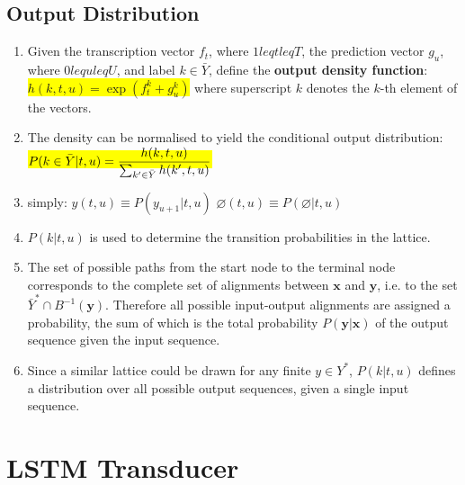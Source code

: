 \subsection{Output Distribution}

\begin{enumerate}
    \item Given the transcription vector $f_t$, where $1 leq t leq T $, the prediction vector $g_u$, where $0 leq u leq U $, and label $k \in \bar{Y}$, define the \textbf{output density function}:
    \colorbox{yellow}{$h(k, t, u) = \exp (f ^k _t + g^k _u ) $}
    where superscript $k$ denotes the $k$-th element of the vectors. 
    \hfill \cite{arxiv/1211.3711/Sequence-Transduction-RNN}

    \item The density can be normalised to yield the conditional output distribution:
    \colorbox{yellow}{$P(k \in \bar{Y}|t, u) = \dfrac{h(k, t, u)}{\textstyle\sum_{k^\prime \in \bar{Y}} h(k^\prime, t, u)}$}
    \hfill \cite{arxiv/1211.3711/Sequence-Transduction-RNN}

    \item simply: 
    \hfill
    $ y(t, u) \equiv P(y_{u+1}|t, u) $
    \hfill
    $ \varnothing(t, u) \equiv P(\varnothing|t, u) $
    \hfill \cite{arxiv/1211.3711/Sequence-Transduction-RNN}

    \item $P(k|t, u)$ is used to determine the transition probabilities in the lattice.
    \hfill \cite{arxiv/1211.3711/Sequence-Transduction-RNN}

    \item The set of possible paths from the start node to the terminal node corresponds to the complete set of alignments between $\bm{x}$ and $\bm{y}$, i.e. to the set $\bar{Y}^\ast \cap B^{-1}(\bm{y})$. 
    Therefore all possible input-output alignments are assigned a probability, the sum of which is the total probability $P(\bm{y}|\bm{x})$ of the output sequence given the input sequence.
    \hfill \cite{arxiv/1211.3711/Sequence-Transduction-RNN}

    \item Since a similar lattice could be drawn for any finite $y \in Y^\ast$, $P(k|t, u)$ defines a distribution over all possible output sequences, given a single input sequence.
    \hfill \cite{arxiv/1211.3711/Sequence-Transduction-RNN}
\end{enumerate}



\section{LSTM Transducer}

